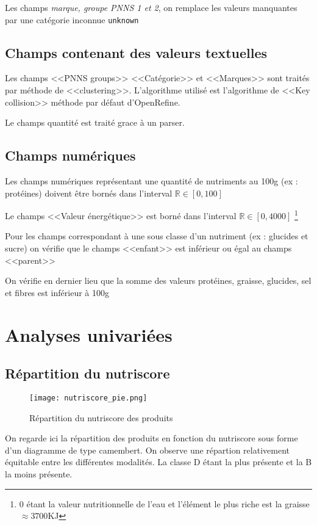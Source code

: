       Les champs \emph{marque, groupe PNNS 1 et 2}, on
      remplace les valeurs manquantes par une catégorie inconnue \verb|unknown|


    \subsection{Champs contenant des valeurs textuelles}

    Les champs <<PNNS groups>> <<Catégorie>> et <<Marques>> sont traités par
    méthode de <<clustering>>. L'algorithme utilisé est l'algorithme de
    <<Key collision>> méthode par défaut d'OpenRefine\cite{OpenRefine}.

    Le champs quantité est traité grace à un parser.

    \subsection{Champs numériques}

    Les champs numériques représentant une quantité de nutriments au 100g (ex : protéines)
    doivent être bornés dans l'interval $\mathbb{R}\in [0, 100]$

    Le champs <<Valeur énergétique>> est borné dans l'interval $\mathbb{R}\in [0, 4000]$
    \footnote{0 étant la valeur nutritionnelle de l'eau et l'élément le plus riche
    est la graisse $\approx 3700$KJ}

    Pour les champs correspondant à une sous classe d'un nutriment (ex : glucides et sucre)
    on vérifie que le champs <<enfant>> est inférieur ou égal au champs <<parent>>

    On vérifie en dernier lieu que la somme des valeurs protéines, graisse,
    glucides, sel et fibres est inférieur à 100g


\section{Analyses univariées}


  \subsection{Répartition du nutriscore}
  \begin{figure}[H]
    \texttt{[image: nutriscore\_pie.png]}
    \caption{Répartition du nutriscore des produits}
    \label{nutriscore_pie}
  \end{figure}
   On regarde ici la répartition des produits en fonction du nutriscore sous forme
   d'un diagramme de type camembert. On observe une répartion relativement équitable
   entre les différentes modalités. La classe D étant la plus présente et la B la moins présente.

